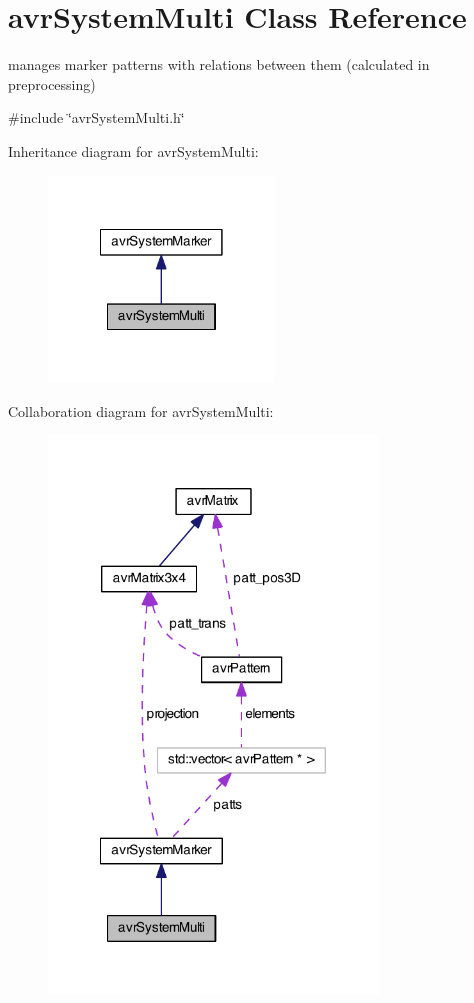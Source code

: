 \hypertarget{classavr_system_multi}{\section{avr\-System\-Multi Class Reference}
\label{classavr_system_multi}
}


manages marker patterns with relations between them (calculated in preprocessing)  




{\ttfamily \#include \char`\"{}avr\-System\-Multi.\-h\char`\"{}}



Inheritance diagram for avr\-System\-Multi\-:\nopagebreak
\begin{figure}[H]
\begin{center}
\leavevmode
\includegraphics[width=170pt]{classavr_system_multi__inherit__graph}
\end{center}
\end{figure}


Collaboration diagram for avr\-System\-Multi\-:\nopagebreak
\begin{figure}[H]
\begin{center}
\leavevmode
\includegraphics[width=248pt]{classavr_system_multi__coll__graph}
\end{center}
\end{figure}
